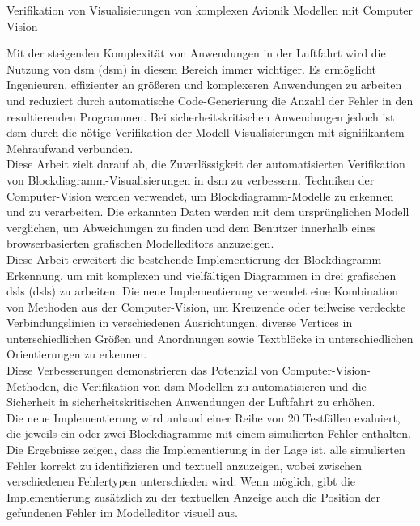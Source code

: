 \label{kurzzusammenfassung}
{\LARGE Verifikation von Visualisierungen von komplexen Avionik Modellen mit Computer Vision}

Mit der steigenden Komplexit{\"a}t von Anwendungen in der Luftfahrt wird die Nutzung von \acrlong{dsm} (\acrshort{dsm}) in diesem Bereich immer wichtiger. Es erm{\"o}glicht Ingenieuren, effizienter an gr{\"o}{\ss}eren und komplexeren Anwendungen zu arbeiten und reduziert durch automatische Code-Generierung die Anzahl der Fehler in den resultierenden Programmen. Bei sicherheitskritischen Anwendungen jedoch ist \acrshort{dsm} durch die n{\"o}tige Verifikation der Modell-Visualisierungen mit signifikantem Mehraufwand verbunden.\\
Diese Arbeit zielt darauf ab, die Zuverl{\"a}ssigkeit der automatisierten Verifikation von Blockdiagramm-Visualisierungen in \acrshort{dsm} zu verbessern. Techniken der Computer-Vision werden verwendet, um Blockdiagramm-Modelle zu erkennen und zu verarbeiten. Die erkannten Daten werden mit dem urspr{\"u}nglichen Modell verglichen, um Abweichungen zu finden und dem Benutzer innerhalb eines browserbasierten grafischen Modelleditors anzuzeigen.\\
Diese Arbeit erweitert die bestehende Implementierung der Blockdiagramm-Erkennung, um mit komplexen und vielf{\"a}ltigen Diagrammen in drei grafischen \acrlong{dsl}s (\acrshort{dsl}s) zu arbeiten. Die neue Implementierung verwendet eine Kombination von Methoden aus der Computer-Vision, um Kreuzende oder teilweise verdeckte Verbindungslinien in verschiedenen Ausrichtungen, diverse Vertices in unterschiedlichen Gr{\"o}{\ss}en und Anordnungen sowie Textbl{\"o}cke in unterschiedlichen Orientierungen zu erkennen.\\
Diese Verbesserungen demonstrieren das Potenzial von Computer-Vision-Methoden, die Verifikation von \acrshort{dsm}-Modellen zu automatisieren und die Sicherheit in sicherheitskritischen Anwendungen der Luftfahrt zu erh{\"o}hen.\\
Die neue Implementierung wird anhand einer Reihe von 20 Testf{\"a}llen evaluiert, die jeweils ein oder zwei Blockdiagramme mit einem simulierten Fehler enthalten. Die Ergebnisse zeigen, dass die Implementierung in der Lage ist, alle simulierten Fehler korrekt zu identifizieren und textuell anzuzeigen, wobei zwischen verschiedenen Fehlertypen unterschieden wird. Wenn m{\"o}glich, gibt die Implementierung zus{\"a}tzlich zu der textuellen Anzeige auch die Position der gefundenen Fehler im Modelleditor visuell aus.